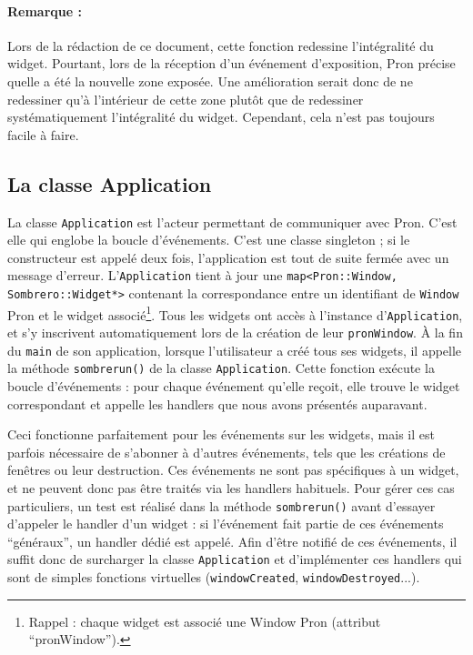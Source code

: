\paragraph{Remarque :}
Lors de la rédaction de ce document, cette fonction redessine l'intégralité du widget.
Pourtant, lors de la réception d'un événement d'exposition, Pron précise quelle a été la nouvelle zone exposée.
Une amélioration serait donc de ne redessiner qu'à l'intérieur de cette zone plutôt que de redessiner systématiquement l'intégralité du widget.
Cependant, cela n'est pas toujours facile à faire.

\subsection{La classe Application}
\label{Application}

La classe \verb|Application| est l'acteur permettant de communiquer avec Pron.
C'est elle qui englobe la boucle d'événements.
C'est une classe singleton ; si le constructeur est appelé deux fois, l'application est tout de suite fermée avec un message d'erreur.
L'\verb|Application| tient à jour une \verb|map<Pron::Window, Sombrero::Widget*>| contenant la correspondance entre un identifiant de \verb|Window| Pron et le widget associé\footnote{Rappel : chaque widget est associé une Window Pron (attribut ``pronWindow'').}.
Tous les widgets ont accès à l'instance d'\verb|Application|, et s'y inscrivent automatiquement lors de la création de leur \verb|pronWindow|.
À la fin du \verb|main| de son application, lorsque l'utilisateur a créé tous ses widgets, il appelle la méthode \verb|sombrerun()| de la classe \verb|Application|.
Cette fonction exécute la boucle d'événements : pour chaque événement qu'elle reçoit, elle trouve le widget correspondant et appelle les handlers que nous avons présentés auparavant.

Ceci fonctionne parfaitement pour les événements sur les widgets, mais il est parfois nécessaire de s'abonner à d'autres événements, tels que les créations de fenêtres ou leur destruction.
Ces événements ne sont pas spécifiques à un widget, et ne peuvent donc pas être traités via les handlers habituels.
Pour gérer ces cas particuliers, un test est réalisé dans la méthode \verb|sombrerun()| avant d'essayer d'appeler le handler d'un widget : si l'événement fait partie de ces événements ``généraux'', un handler dédié est appelé.
Afin d'être notifié de ces événements, il suffit donc de surcharger la classe \verb|Application| et d'implémenter ces handlers qui sont de simples fonctions virtuelles (\verb|windowCreated|, \verb|windowDestroyed|...).

